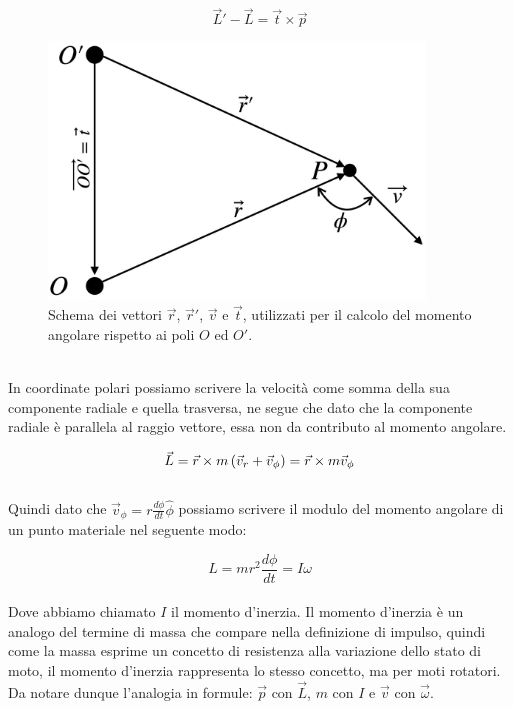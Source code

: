\begin{equation}
    \boxed{\vec L'-\vec L = \vec t\times\vec p}
\label{eg:momentum:L_pole_change}
\end{equation}
\begin{figure}[htbp]
    \begin{center}
        \includegraphics[width=10cm]{images/momang1.png}
        \caption{Schema dei vettori $\vec r$, $\vec r'$, $\vec v$ e $\vec t$,
        utilizzati per il calcolo del momento angolare rispetto ai poli $O$ ed
        $O'$.}
\label{fig:momentum:pole_change}
\end{center}
\end{figure}
\\
In coordinate polari possiamo scrivere la velocità come somma della sua
componente radiale e quella trasversa, ne segue che dato che la componente
radiale è parallela al raggio vettore, essa non da contributo al momento
angolare.

\begin{equation}
    \vec L = \vec r \times m\left( \vec v_r+\vec v_\phi\right) = \vec r \times m\vec v_\phi
\end{equation}
\\
Quindi dato che $\vec v_\phi = r\frac{d\phi}{dt}\hat\phi$ possiamo scrivere il modulo
del momento angolare di un punto materiale nel seguente modo:

\begin{equation}
    \boxed{L = mr^2\frac{d\phi}{dt} = I\omega}
\label{eq:momentum:l=Iw}
\end{equation}
\\
Dove abbiamo chiamato $I$ il momento d'inerzia. Il momento d'inerzia è un
analogo del termine di massa che compare nella definizione di impulso,
quindi come la massa esprime un concetto di resistenza alla variazione dello
stato di moto, il momento d'inerzia rappresenta lo stesso concetto, ma per
moti rotatori. Da notare dunque l'analogia in formule:
$\vec p$ con $\vec L$, $m$ con $I$ e $\vec v$ con $\vec \omega$.

